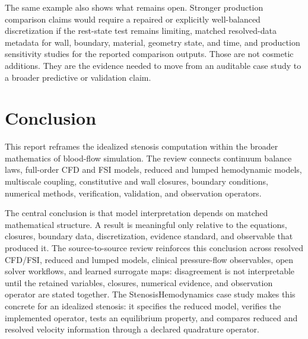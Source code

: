 The same example also shows what remains open. Stronger production comparison
claims would require a repaired or explicitly well-balanced discretization if
the rest-state test remains limiting, matched resolved-data metadata for wall,
boundary, material, geometry state, and time, and production sensitivity studies
for the reported comparison outputs. Those are not cosmetic additions. They are
the evidence needed to move from an auditable case study to a broader predictive
or validation claim.

\section{Conclusion}
\label{sec:conclusions-limitations}

This report reframes the idealized stenosis computation within the broader
mathematics of blood-flow simulation. The review connects continuum balance
laws, full-order CFD and FSI models, reduced and lumped hemodynamic models,
multiscale coupling, constitutive and wall closures, boundary conditions,
numerical methods, verification, validation, and observation operators.

The central conclusion is that model interpretation depends on matched
mathematical structure. A result is meaningful only relative to the equations,
closures, boundary data, discretization, evidence standard, and observable that
produced it. The source-to-source review reinforces this conclusion across
resolved CFD/FSI, reduced and lumped models, clinical pressure-flow
observables, open solver workflows, and learned surrogate maps: disagreement is
not interpretable until the retained variables, closures, numerical evidence,
and observation operator are stated together. The StenosisHemodynamics case
study makes this concrete for an
idealized stenosis: it specifies the reduced model, verifies the implemented
operator, tests an equilibrium property, and compares reduced and resolved
velocity information through a declared quadrature operator.

